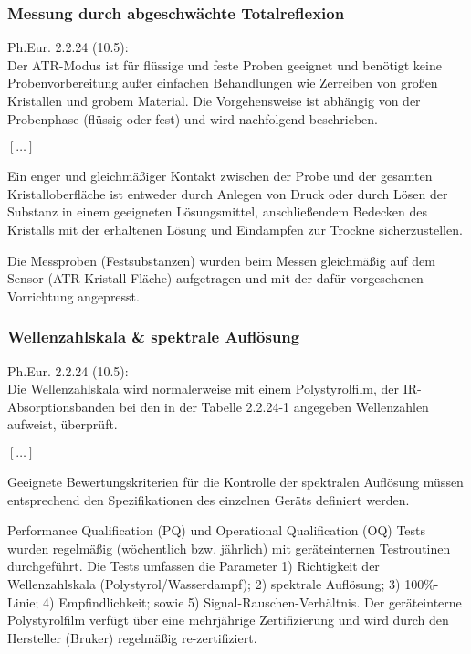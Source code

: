 \documentclass[11pt, a4paper]{article}
\newcommand\VersionPhEur{10.5}
\begin{document}
\subsubsection{Messung durch abgeschwächte Totalreflexion}
\begin{framed}
Ph.Eur. 2.2.24 (\VersionPhEur): \\

Der ATR-Modus ist für flüssige und feste Proben geeignet und benötigt keine Probenvorbereitung außer einfachen Behandlungen wie Zerreiben von großen Kristallen und grobem Material. Die Vorgehensweise ist abhängig von der Probenphase (flüssig oder fest) und wird nachfolgend beschrieben.

$[\dots]$

Ein enger und gleichmäßiger Kontakt zwischen der Probe und der gesamten Kristalloberfläche ist entweder durch Anlegen von Druck oder durch Lösen der Substanz in einem geeigneten Lösungsmittel, anschließendem Bedecken des Kristalls mit der erhaltenen Lösung und Eindampfen zur Trockne sicherzustellen.
\end{framed}

Die Messproben (Festsubstanzen) wurden beim Messen gleichmäßig auf dem Sensor (ATR-Kristall-Fläche) aufgetragen und mit der dafür vorgesehenen Vorrichtung angepresst.

\subsubsection{Wellenzahlskala \& spektrale Auflösung}
\begin{framed}
Ph.Eur. 2.2.24 (\VersionPhEur):\\

Die Wellenzahlskala wird normalerweise mit einem Polystyrolfilm, der IR-Absorptionsbanden bei den in der Tabelle 2.2.24-1 angegeben Wellenzahlen aufweist, überprüft.

$[\dots]$

Geeignete Bewertungskriterien für die Kontrolle der spektralen Auflösung müssen entsprechend den Spezifikationen des einzelnen Geräts definiert werden.
\end{framed}

Performance Qualification (PQ) und Operational Qualification (OQ) Tests wurden regelmäßig (wöchentlich bzw. jährlich) mit geräteinternen Testroutinen durchgeführt. Die Tests umfassen die Parameter 1) Richtigkeit der Wellenzahlskala (Polystyrol/Wasserdampf); 2) spektrale Auflösung; 3) 100\%-Linie; 4) Empfindlichkeit; sowie 5) Signal-Rauschen-Verhältnis. Der geräteinterne Polystyrolfilm verfügt über eine mehrjährige Zertifizierung und wird durch den Hersteller (Bruker) regelmäßig re-zertifiziert.
\end{document}
